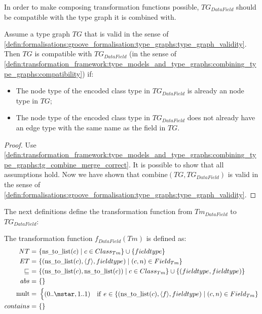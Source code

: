 In order to make composing transformation functions possible, $TG_{DataField}$ should be compatible with the type graph it is combined with.

\begin{thm}
\label{defin:library_of_transformations:type_level_transformations:data_fields:tg_data_field_as_edge_type_combine_correct}
Assume a type graph $TG$ that is valid in the sense of \cref{defin:formalisations:groove_formalisation:type_graphs:type_graph_validity}. Then $TG$ is compatible with $TG_{DataField}$ (in the sense of \cref{defin:transformation_framework:type_models_and_type_graphs:combining_type_graphs:compatibility}) if:
\begin{itemize}
    \item The node type of the encoded class type in $TG_{DataField}$ is already an node type in $TG$;
    \item The node type of the encoded class type in $TG_{DataField}$ does not already have an edge type with the same name as the field in $TG$.
\end{itemize}
\end{thm}

\begin{proof}
Use \cref{defin:transformation_framework:type_models_and_type_graphs:combining_type_graphs:tg_combine_merge_correct}. It is possible to show that all assumptions hold. Now we have shown that $\mathrm{combine}(TG, TG_{DataField})$ is valid in the sense of \cref{defin:formalisations:groove_formalisation:type_graphs:type_graph_validity}.
\end{proof}

The next definitions define the transformation function from $Tm_{DataField}$ to $TG_{DataField}$:

\begin{defin}
\label{defin:library_of_transformations:type_level_transformations:data_fields:tmod_data_field_to_tg_data_field_as_edge_type}
The transformation function $f_{DataField}(Tm)$ is defined as:
\begin{align*}
NT =\ &\{\mathrm{ns\_\!to\_\!list}(c) \mid c \in Class_{Tm}\} \cup \{fieldtype\}\\
ET =\ &\{(\mathrm{ns\_\!to\_\!list}(c), \langle f \rangle, fieldtype) \mid (c, n) \in Field_{Tm} \} \\
\!\!\sqsubseteq\ =\ &\{( \mathrm{ns\_\!to\_\!list}(c), \mathrm{ns\_\!to\_\!list}(c) ) \mid c \in Class_{Tm} \} \cup \{( fieldtype, fieldtype ) \} \\
abs =\ &\{\} \\
\mathrm{mult} =\ &\begin{cases}
    (0..\mstar, 1..1) &\mathrm{if}\ e \in \{(\mathrm{ns\_\!to\_\!list}(c), \langle f \rangle, fieldtype) \mid (c, n) \in Field_{Tm} \}
\end{cases} \\
contains =\ &\{\}
\end{align*}
\end{defin}

